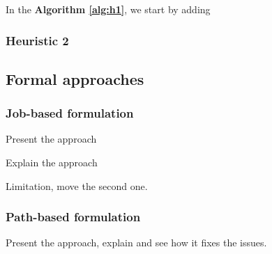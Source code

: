 \documentclass[letter]{article}
\begin{document}








In the \textbf{Algorithm \ref{alg:h1}}, we start by adding 

\subsubsection{Heuristic 2}

\subsection{Formal approaches}

\subsubsection{Job-based formulation}
Present the approach

Explain the approach

Limitation, move the second one.

\subsubsection{Path-based formulation}
Present the approach, explain and see how it fixes the issues.
\end{document}
